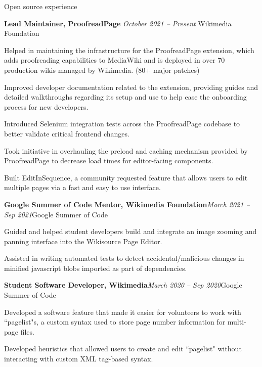 \documentclass{resume} %
\begin{document}
\begin{rSection}{Open source experience}
\begin{rSubsection}{ \bf Lead Maintainer, ProofreadPage}{ \em October 2021 -- Present }{Wikimedia Foundation}{}
\item Helped in maintaining the infrastructure for the ProofreadPage extension, which adds proofreading capabilities to MediaWiki and is deployed in over 70 production wikis managed by Wikimedia. (80+ major patches)
\item Improved developer documentation related to the extension, providing guides and detailed walkthroughs regarding its setup and use to help ease the onboarding process for new developers.
\item Introduced Selenium integration tests across the ProofreadPage codebase to better validate critical frontend changes.
\item Took initiative in overhauling the preload and caching mechanism provided by ProofreadPage to decrease load times for editor-facing components.
\item Built EditInSequence, a community requested feature that allows users to edit multiple pages via a fast and easy to use interface.
\end{rSubsection}
\begin{rSubsection}{\bf Google Summer of Code Mentor, Wikimedia Foundation}{\em March 2021 -- Sep 2021}{Google Summer of Code}{}
\item Guided and helped student developers build and integrate an image zooming and panning interface into the Wikisource Page Editor.
\item Assisted in writing automated tests to detect accidental/malicious changes in minified javascript blobs imported as part of dependencies.
\end{rSubsection}
\begin{rSubsection}{ \bf Student Software Developer, Wikimedia}{\em March 2020 -- Sep 2020}{Google Summer of Code}{}
\item Developed a software feature that made it easier for volunteers to work with ``pagelist"s, a custom syntax used to store page number information for multi-page files.
\item Developed heuristics that allowed users to create and edit ``pagelist" without interacting with custom XML tag-based syntax. 
\end{rSubsection}
\end{rSection}
\end{document}

